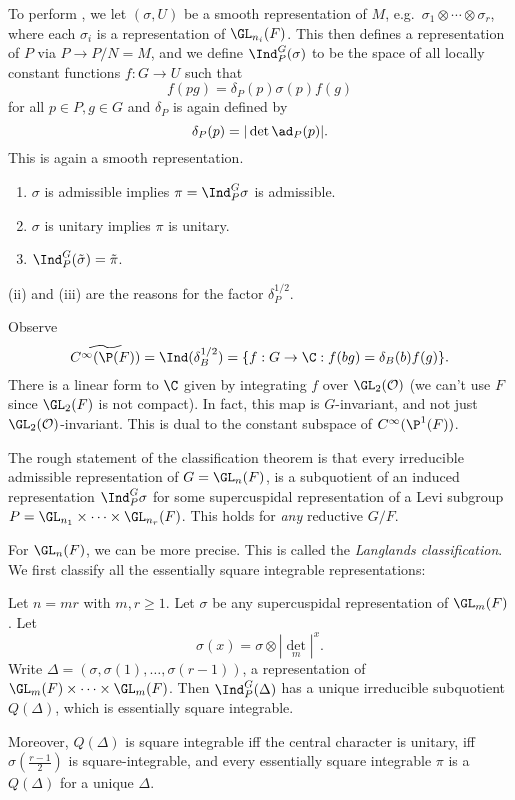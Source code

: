 \documentclass[a4paper]{article}
\begin{document}
To perform , we let $(\sigma, U)$ be a smooth representation of $M$, e.g.\ $\sigma_1 \otimes \cdots \otimes \sigma_r$, where each $\sigma_i$ is a representation of $\GL_{n_i}(F)$. This then defines a representation of $P$ via $P \to P/N = M$, and we define $\Ind_P^G(\sigma)$ to be the space of all locally constant functions $f: G \to U$ such that
\[
  f(pg) = \delta_P(p) \sigma(p) f(g)
\]
for all $p \in P, g \in G$ and $\delta_P$ is again defined by
\[
  \delta_P(p) = |\det \ad_P(p)|.
\]
This is again a smooth representation.

\begin{prop}\leavevmode
  \begin{enumerate}
    \item $\sigma$ is admissible implies $\pi = \Ind_P^G \sigma$ is admissible.
    \item $\sigma$ is unitary implies $\pi$ is unitary.
    \item $\Ind_P^G(\tilde{\sigma}) = \tilde{\pi}$.\fakeqed
  \end{enumerate}
\end{prop}
(ii) and (iii) are the reasons for the factor $\delta_P^{1/2}$.

\begin{eg}
  Observe
  \[
    \widetilde{C^\infty(\P(F))} = \Ind(\delta_B^{1/2}) = \{f: G \to \C: f(bg) = \delta_B(b) f(g)\}.
  \]
  There is a linear form to $\C$ given by integrating $f$ over $\GL_2(\mathcal{O})$ (we can't use $F$ since $\GL_2(F)$ is not compact). In fact, this map is $G$-invariant, and not just $\GL_2(\mathcal{O})$-invariant. This is dual to the constant subspace of $C^\infty(\P^1(F))$.
\end{eg}

The rough statement of the classification theorem is that every irreducible admissible representation of $G = \GL_n(F)$, is a subquotient of an induced representation $\Ind_P^G \sigma$ for some supercuspidal representation of a Levi subgroup $P = \GL_{n_1} \times \cdots \times \GL_{n_r}(F)$. This holds for \emph{any} reductive $G/F$.

For $\GL_n(F)$, we can be more precise. This is called the \emph{Langlands classification}. We first classify all the essentially square integrable representations:

\begin{thm}
  Let $n = mr$ with $m, r \geq 1$. Let $\sigma$ be any supercuspidal representation of $\GL_m(F)$. Let
  \[
    \sigma(x) = \sigma \otimes |{\det}_m|^x.
  \]
  Write $\Delta = (\sigma, \sigma(1), \ldots, \sigma(r - 1))$, a representation of $\GL_m(F) \times \cdots \times \GL_m(F)$. Then $\Ind_P^G(\Delta)$ has a unique irreducible subquotient $Q(\Delta)$, which is essentially square integrable.

  Moreover, $Q(\Delta)$ is square integrable iff the central character is unitary, iff $\sigma(\frac{r - 1}{2})$ is square-integrable, and every essentially square integrable $\pi$ is a $Q(\Delta)$ for a unique $\Delta$.
\end{thm}
\end{document}
